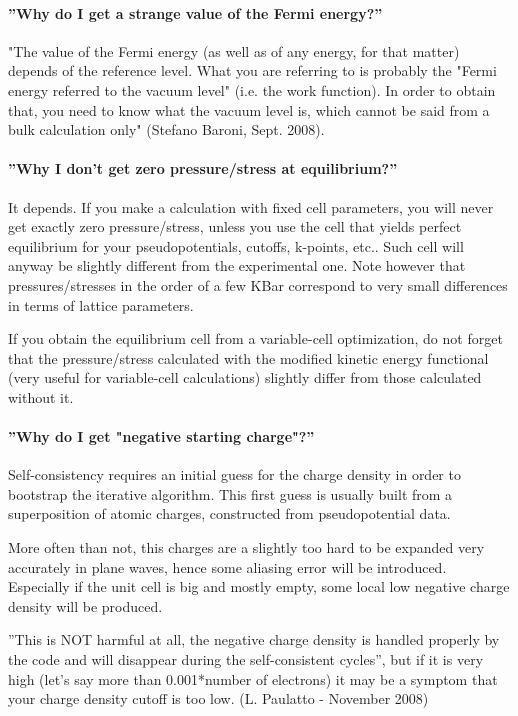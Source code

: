 \documentclass[12pt,a4paper]{article}
\begin{document}
\paragraph{ ''Why do I get a strange value of the Fermi energy?''}
"The value of the Fermi energy (as well as of any energy, for that
matter) depends of the reference level. What you are referring to is
probably the "Fermi energy referred to the vacuum level" (i.e.  
the work function). In order to obtain that, you need to know what the
vacuum level is, which cannot be said from a bulk calculation only"
(Stefano Baroni, Sept. 2008). 

\paragraph{''Why I don't get zero pressure/stress at equilibrium?''}
It depends. If you make a calculation with fixed cell parameters, you
will never get exactly zero pressure/stress, unless you use the cell
that yields perfect equilibrium for your pseudopotentials,  cutoffs,
k-points, etc.. Such cell will anyway be slightly different from the
experimental one. Note however that pressures/stresses in the order of
a few KBar correspond to very small differences in terms of lattice parameters.

If you obtain the equilibrium cell from a variable-cell optimization,
do not forget that the pressure/stress calculated with the modified
kinetic energy functional (very useful for variable-cell calculations)
slightly differ from those calculated without it. 

\paragraph{ ''Why do I get "negative starting charge"?'' }
Self-consistency requires an initial guess for the charge density in
order to bootstrap the iterative algorithm. This first guess is
usually built from a superposition of atomic charges, constructed from
pseudopotential data. 

More often than not, this charges are a slightly too hard to be
expanded very accurately in plane waves, hence some aliasing error
will be introduced. Especially if the unit cell is big and mostly
empty, some local low negative charge density will be produced. 

''This is NOT harmful at all, the negative charge density is handled
properly by the code and will disappear during the self-consistent
cycles'', but if it is very high (let's say more than 0.001*number of
electrons) it may be a symptom that your charge density cutoff is too
low. (L. Paulatto - November 2008)
\end{document}
